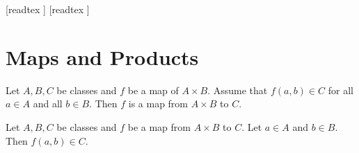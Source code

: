 \documentclass[10pt]{article}
\begin{document}
  \begin{imports}
    \begin{forthel}
      [readtex ]
      [readtex ]
    \end{forthel}
  \end{imports}


  \section*{Maps and Products}

  \begin{forthel}
    \begin{proposition}[id=FOUNDATIONS_06_2754759509409792,printid]
      Let $A, B, C$ be classes and $f$ be a map of $A \times B$.
      Assume that $f(a,b) \in C$ for all $a \in A$ and all $b \in B$.
      Then $f$ is a map from $A \times B$ to $C$.
    \end{proposition}
  \end{forthel}

  \begin{forthel}
    \begin{proposition}[id=FOUNDATIONS_06_2304295212941312,printid]
      Let $A, B, C$ be classes and $f$ be a map from $A \times B$ to $C$.
      Let $a \in A$ and $b \in B$.
      Then $f(a,b) \in C$.
    \end{proposition}
  \end{forthel}
\end{document}
